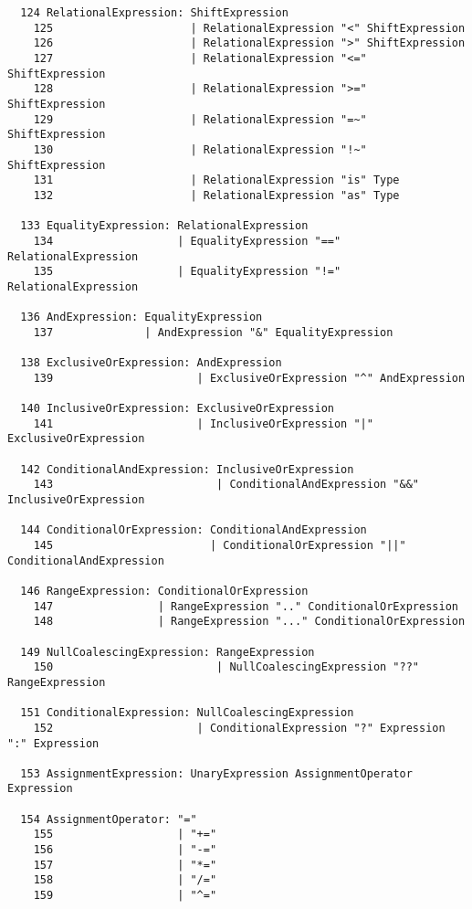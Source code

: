 \begin{espacosimples}
\begin{scriptsize}
\begin{lstlisting}
  124 RelationalExpression: ShiftExpression
    125                     | RelationalExpression "<" ShiftExpression
    126                     | RelationalExpression ">" ShiftExpression
    127                     | RelationalExpression "<=" ShiftExpression
    128                     | RelationalExpression ">=" ShiftExpression
    129                     | RelationalExpression "=~" ShiftExpression
    130                     | RelationalExpression "!~" ShiftExpression
    131                     | RelationalExpression "is" Type
    132                     | RelationalExpression "as" Type
  
  133 EqualityExpression: RelationalExpression
    134                   | EqualityExpression "==" RelationalExpression
    135                   | EqualityExpression "!=" RelationalExpression
  
  136 AndExpression: EqualityExpression
    137              | AndExpression "&" EqualityExpression
  
  138 ExclusiveOrExpression: AndExpression
    139                      | ExclusiveOrExpression "^" AndExpression
  
  140 InclusiveOrExpression: ExclusiveOrExpression
    141                      | InclusiveOrExpression "|" ExclusiveOrExpression
  
  142 ConditionalAndExpression: InclusiveOrExpression
    143                         | ConditionalAndExpression "&&" InclusiveOrExpression
  
  144 ConditionalOrExpression: ConditionalAndExpression
    145                        | ConditionalOrExpression "||" ConditionalAndExpression
  
  146 RangeExpression: ConditionalOrExpression
    147                | RangeExpression ".." ConditionalOrExpression
    148                | RangeExpression "..." ConditionalOrExpression
  
  149 NullCoalescingExpression: RangeExpression
    150                         | NullCoalescingExpression "??" RangeExpression
  
  151 ConditionalExpression: NullCoalescingExpression
    152                      | ConditionalExpression "?" Expression ":" Expression
  
  153 AssignmentExpression: UnaryExpression AssignmentOperator Expression
  
  154 AssignmentOperator: "="
    155                   | "+="
    156                   | "-="
    157                   | "*="
    158                   | "/="
    159                   | "^="
  

\end{lstlisting}
\end{scriptsize}
\end{espacosimples}
